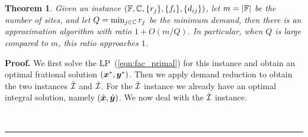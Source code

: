 \documentclass[oneside,final]{ucr}
\newtheorem{theorem}{Theorem}
\newenvironment{proof}[1][Proof]{\textbf{#1.} }{\ \rule{0.5em}{0.5em}}
\begin{document}
\begin{theorem}
  \label{thm:largeR}
  Given an {\FTFP} instance $(\mathbb{F}, \mathbb{C}, \{r_j\}
  , \{f_i\}, \{d_{ij}\})$, let $m = |\mathbb{F}|$ be the
  number of sites, and let $Q = \min_{j\in\mathbb{C}} r_j$
  be the minimum demand, then there is an approximation
  algorithm with ratio $1 + O(m/Q)$. In particular, when $Q$
  is large compared to $m$, this ratio approaches $1$.
\end{theorem}
\begin{proof}
  We first solve the LP~(\ref{eqn:fac_primal}) for this
  instance and obtain an optimal frational solution
  $(\boldsymbol{x}^\ast, \boldsymbol{y}^\ast)$. Then we apply demand reduction
  to obtain the two instances $\hat {\mathcal{I}}$ and $\dot
  {\mathcal{I}}$. For the $\hat {\mathcal{I}}$ instance we already have an
  optimal integral solution, namely
  $(\hat{\boldsymbol{x}},\hat{\boldsymbol{y}})$. We now deal with the $\dot{\mathcal{I}}$
  instance.


\end{proof}
\end{document}
